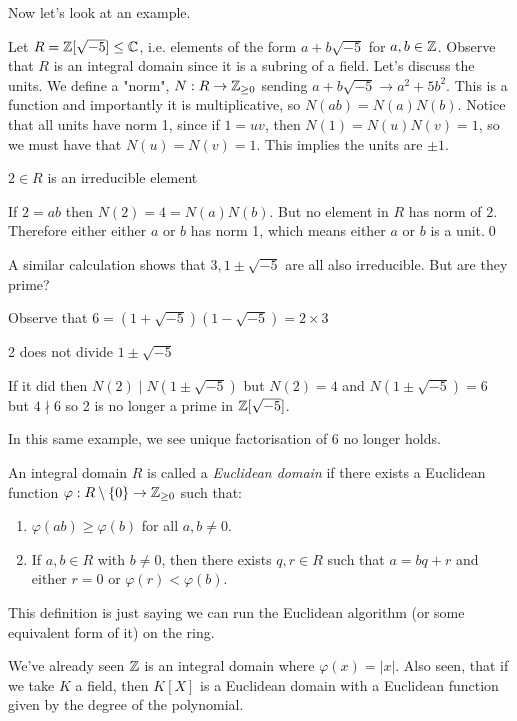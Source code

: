 \documentclass{article}
\begin{document}
Now let's look at an example.\par
Let $ R=\mathbb{Z}[\sqrt{-5}]\le \mathbb{C} $, i.e. elements of the form $ a+b\sqrt{-5} $ for $ a,b\in \mathbb{Z} $. Observe that $ R $ is an integral domain since it is a subring of a field. Let's discuss the units. We define a "norm", $ N:R\to \mathbb{Z}_{\ge 0} $ sending $ a+b\sqrt{-5}\to a^2+5b^2 $. This is a function and importantly it is multiplicative, so $ N(ab)=N(a)N(b) $. Notice that all units have norm 1, since if $ 1=uv $, then $ N(1)=N(u)N(v)=1 $, so we must have that $ N(u)=N(v)=1 $. This implies the units are $ \pm 1 $.
\begin{claim}
  $ 2\in R $ is an irreducible element
\end{claim}
\pf If $ 2=ab $ then $ N(2)=4=N(a)N(b) $. But no element in $ R $ has norm of $ 2 $. Therefore either either $ a $ or $ b $ has norm 1, which means either $ a $ or $ b $ is a unit.\qed\par
A similar calculation shows that $ 3, 1\pm \sqrt{-5} $ are all also irreducible.
But are they prime?\par
Observe that $ 6=(1+\sqrt{-5})(1-\sqrt{-5})=2\times 3 $
\begin{claim}
	2 does not divide $ 1\pm \sqrt{-5} $
\end{claim}
\pf If it did then $ N(2)\mid N(1\pm\sqrt{-5}) $ but $ N(2)=4 $ and $ N(1\pm \sqrt{-5})=6 $ but $ 4\nmid 6 $ so 2 is no longer a prime in $ \mathbb{Z}[\sqrt{-5}] $.\par
In this same example, we see unique factorisation of 6 no longer holds.

\begin{definition}
	An integral domain $ R $ is called a \textit{Euclidean domain} if there exists a Euclidean function $ \varphi:R\setminus \{0\}\to\mathbb{Z}_{\ge 0} $ such that:
	\begin{enumerate}
	\item $ \varphi(ab)\ge \varphi(b) $ for all $ a,b\ne 0 $.
	\item If $ a,b\in R $ with $ b\ne 0 $, then there exists $ q,r\in R $ such that $ a=bq+r $ and either $ r=0 $ or $ \varphi(r)<\varphi(b) $.
	\end{enumerate}
\end{definition}
This definition is just saying we can run the Euclidean algorithm (or some equivalent form of it) on the ring.\par
We've already seen $ \mathbb{Z} $ is an integral domain where $ \varphi(x)=|x| $. Also seen, that if we take $ K $ a field, then $ K[X] $ is a Euclidean domain with a Euclidean function given by the degree of the polynomial.\par
\end{document}
